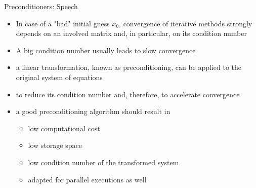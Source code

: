 \begin{frame}[t]{Preconditioners: Speech}
\small
\justifying

\begin{itemize}
	\item In case of a "bad" initial guess $x_{0}$, convergence of iterative methods strongly depends on an involved matrix and, in particular, on its condition number
	
	\item A big condition number usually leads to slow convergence
	
	\item a linear transformation, known as preconditioning, can be applied to the original system of equations
	
	\item to reduce its condition number and, therefore, to accelerate convergence
\end{itemize}

\begin{itemize}
	\item a good preconditioning algorithm should result in
	
	\begin{itemize}
		\item low computational cost
		\item low storage space 
		\item low condition number of the transformed system
		\item adapted for parallel executions as well
	\end{itemize}
\end{itemize}
\end{frame}
\fi


